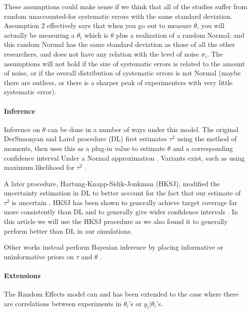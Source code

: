 \documentclass[12pt]{article}
\begin{document}
These assumptions could make sense if we think that all of the studies suffer from random unaccounted-for systematic errors with the same standard deviation. Assumption 2 effectively says that when you go out to measure $\theta$, you will actually be measuring a $\theta_i$ which is $\theta$ plus a realization of a random Normal; and this random Normal has the same standard deviation as those of all the other researchers, and does not have any relation with the level of noise $\sigma_i$. The assumptions will not hold if the size of systematic errors is related to the amount of noise, or if the overall distribution of systematic errors is not Normal (maybe there are outliers, or there is a sharper peak of experimenters with very little systematic error).

\paragraph{Inference}\label{inference}

Inference on $\theta$ can be done in a number of ways under this model. The original DerSimonyan and Laird procedure (DL) first estimates $\tau^2$ using the method of moments, then uses this as a plug-in value to estimate $\theta$ and a corresponding confidence interval Under a Normal approximation \citep{dersimonian1986meta}. Variants exist, such as using maximum likelihood for $\tau^2$ \citep{dersimonian1986meta,jackson2010does}.

A later procedure, Hartung-Knapp-Sidik-Jonkman (HKSJ), modified the uncertainty estimation in DL to better account for the fact that our estimate of $\tau^2$ is uncertain \citep{hartung1999alternative,sidik2002simple}. HKSJ has been shown to generally achieve target coverage far more consistently than DL \citep{inthout2014hartung} and to generally give wider confidence intervals \citep{wiksten2016hartung}. In this article we will use the HKSJ procedure as we also found it to generally perform better than DL in our simulations.

Other works instead perform Bayesian inference by placing informative or uninformative priors on $\tau$ and $\theta$ \citep{sutton2001bayesian}.

\paragraph{Extensions}\label{extensions}

The Random Effects model can and has been extended to the case where there are correlations between experiments in $\theta_i$'s or $y_i|\theta_i$'s.
\end{document}
